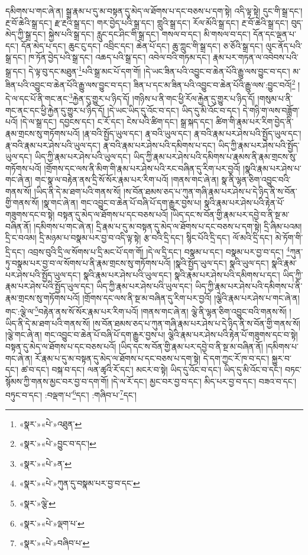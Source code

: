 དམིགས་པ་གང་ཞེ་ན། སྒྲ་རྣམ་པ་དུ་མ་བསྟན་དུ་མེད་ལ་ཐོགས་པ་དང་བཅས་པ་དག་སྟེ། འདི་ལྟ་སྟེ། དུང་གི་སྒྲ་དང་། རྔ་བོ་ཆེའི་སྒྲ་དང་། རྫ་རྔའི་སྒྲ་དང་། གར་བྱེད་པའི་སྒྲ་དང་། གླུའི་སྒྲ་དང་། རོལ་མོའི་སྒྲ་དང་། རྔ་བོ་ཆེའི་སྒྲ་དང་། བུད་མེད་ཀྱི་སྒྲ་དང་། སྐྱེས་པའི་སྒྲ་དང་། རླུང་དང་ཤིང་གི་སྒྲ་དང་། གསལ་བ་དང་། མི་གསལ་བ་དང་། དོན་དང་ལྡན་པ་དང་། དོན་མེད་པ་དང་། ཆུང་ངུ་དང་། འབྲིང་དང་། ཆེན་པོ་དང་། ཆུ་ཀླུང་གི་སྒྲ་དང་། ཅ་ཅོའི་སྒྲ་དང་། ལུང་ནོད་པའི་སྒྲ་དང་། ཁ་ཏོན་བྱེད་པའི་སྒྲ་དང་། འཆད་པའི་སྒྲ་དང་། འབེལ་བའི་གཏམ་དང་། རྣམ་པར་གཏན་ལ་འབེབས་པའི་སྒྲ་དང་། དེ་ལྟ་བུ་དང་མཐུན་\footnote{«སྣར་»«པེ་»འཐུན་}པའི་སྒྲ་མང་པོ་དག་གོ། །དེ་ཡང་ཟིན་པའི་འབྱུང་བ་ཆེན་པོའི་རྒྱུ་ལས་བྱུང་བ་དང་། མ་ཟིན་པའི་འབྱུང་བ་ཆེན་པོའི་རྒྱུ་ལས་བྱུང་བ་དང་། ཟིན་པ་དང་མ་ཟིན་པའི་འབྱུང་བ་ཆེན་པོའི་རྒྱུ་ལས་:བྱུང་བའོ།\footnote{«སྣར་»«པེ་»བྱུང་བ་དང་།} །དེ་ལ་དང་པོ་ནི་གང་ནང་\footnote{«སྣར་»«པེ་»ན་}རྐྱེན་དུ་གྱུར་པ་ཉིད་དོ། །གཉིས་པ་ནི་གང་ཕྱི་རོལ་རྐྱེན་དུ་གྱུར་པ་ཉིད་དོ། །གསུམ་པ་ནི་གང་ནང་དང་ཕྱི་རྐྱེན་དུ་གྱུར་པ་ཉིད་དོ། །དེ་ཡང་ཡིད་དུ་འོང་བ་དང་། ཡིད་དུ་མི་འོང་བ་དང་། དེ་གཉི་ག་ལས་བཟློག་པའོ། །དེ་ལ་སྒྲ་དང་། དབྱངས་དང་། ང་རོ་དང་། ངེས་པའི་ཚིག་དང་། སྒྲ་སྐད་དང་། ཚིག་གི་རྣམ་པར་རིག་བྱེད་ནི་རྣམ་གྲངས་སུ་གཏོགས་པའོ། །རྣ་བའི་སྤྱོད་ཡུལ་དང་། རྣ་བའི་ཡུལ་དང་། རྣ་བའི་རྣམ་པར་ཤེས་པའི་སྤྱོད་ཡུལ་དང་། རྣ་བའི་རྣམ་པར་ཤེས་པའི་ཡུལ་དང་། རྣ་བའི་རྣམ་པར་ཤེས་པའི་དམིགས་པ་དང་། ཡིད་ཀྱི་རྣམ་པར་ཤེས་པའི་སྤྱོད་ཡུལ་དང་། ཡིད་ཀྱི་རྣམ་པར་ཤེས་པའི་ཡུལ་དང་། ཡིད་ཀྱི་རྣམ་པར་ཤེས་པའི་དམིགས་པ་རྣམས་ནི་རྣམ་གྲངས་སུ་གཏོགས་པའོ། །གྲོགས་དང་ལས་ནི་མིག་གི་རྣམ་པར་ཤེས་པའི་རང་བཞིན་དུ་རིག་པར་བྱའོ། །སྣའི་རྣམ་པར་ཤེས་པ་གང་ཞེ་ན། གང་སྣ་ལ་བརྟེན་ནས་དྲི་སོ་སོར་རྣམ་པར་རིག་པའོ། །གནས་གང་ཞེ་ན། སྣ་ནི་ལྷན་ཅིག་འབྱུང་བའི་གནས་སོ། །ཡིད་ནི་དེ་མ་ཐག་པའི་གནས་སོ། །ས་བོན་ཐམས་ཅད་པ་ཀུན་གཞི་རྣམ་པར་ཤེས་པ་དེ་ཉིད་ནི་ས་བོན་གྱི་གནས་སོ། །སྣ་གང་ཞེ་ན། གང་འབྱུང་བ་ཆེན་པོ་བཞི་པོ་དག་རྒྱུར་བྱས་པ། སྣའི་རྣམ་པར་ཤེས་པའི་རྟེན་པོ་གཟུགས་དང་བ་སྟེ། བསྟན་དུ་མེད་ལ་ཐོགས་པ་དང་བཅས་པའོ། །ཡིད་དང་ས་བོན་གྱི་རྣམ་པར་དབྱེ་བ་ནི་སྔ་མ་བཞིན་ནོ། །དམིགས་པ་གང་ཞེ་ན། དྲི་རྣམ་པ་དུ་མ་བསྟན་དུ་མེད་ལ་ཐོགས་པ་དང་བཅས་པ་དག་སྟེ། དྲི་ཞིམ་པའམ། དྲི་ང་བའམ། དྲི་མཉམ་པ་བསྣམ་པར་བྱ་བ་འདི་ལྟ་སྟེ། རྩ་བའི་དྲི་དང་། སྙིང་པོའི་དྲི་དང་། ལོ་མའི་དྲི་དང་། མེ་ཏོག་གི་དྲི་དང་། འབྲས་བུའི་དྲི་ལ་སོགས་པ་དྲི་མང་པོ་དག་གོ། །དེ་ལ་དྲི་དང་། བསྣམ་པ་དང་། བསྣམ་པར་བྱ་བ་དང་། \footnote{«སྣར་»«པེ་»ཀུན་དུ་བསྣམ་པར་བྱ་བ་དང་}ཀུན་ཏུ་བསྣམ་པར་བྱ་བ་ལ་སོགས་པ་ནི་རྣམ་གྲངས་སུ་གཏོགས་པའོ། །སྣའི་སྤྱོད་ཡུལ་དང་། སྣའི་ཡུལ་དང་། སྣའི་རྣམ་པར་ཤེས་པའི་སྤྱོད་ཡུལ་དང་། སྣའི་རྣམ་པར་ཤེས་པའི་ཡུལ་དང་། སྣའི་རྣམ་པར་ཤེས་པའི་དམིགས་པ་དང་། ཡིད་ཀྱི་རྣམ་པར་ཤེས་པའི་སྤྱོད་ཡུལ་དང་། ཡིད་ཀྱི་རྣམ་པར་ཤེས་པའི་ཡུལ་དང་། ཡིད་ཀྱི་རྣམ་པར་ཤེས་པའི་དམིགས་པ་ནི་རྣམ་གྲངས་སུ་གཏོགས་པའོ། །གྲོགས་དང་ལས་ནི་སྔ་མ་བཞིན་དུ་རིག་པར་བྱའོ། །ལྕེའི་རྣམ་པར་ཤེས་པ་གང་ཞེ་ན། གང་:ལྕེ་ལ་\footnote{«སྣར་»ལྕེ་}བརྟེན་ནས་སོ་སོར་རྣམ་པར་རིག་པའོ། །གནས་གང་ཞེ་ན། ལྕེ་ནི་ལྷན་ཅིག་འབྱུང་བའི་གནས་སོ། །ཡིད་ནི་དེ་མ་ཐག་པའི་གནས་སོ། །ས་བོན་ཐམས་ཅད་པ་ཀུན་གཞི་རྣམ་པར་ཤེས་པ་དེ་ཉིད་ནི་ས་བོན་གྱི་གནས་སོ། །ལྕེ་གང་ཞེ་ན། གང་འབྱུང་བ་ཆེན་པོ་བཞི་པོ་དག་རྒྱུར་བྱས་པ། ལྕེའི་རྣམ་པར་ཤེས་པའི་རྟེན་པོ་གཟུགས་དང་བ་སྟེ། བསྟན་དུ་མེད་ལ་ཐོགས་པ་དང་བཅས་པའོ། །ཡིད་དང་ས་བོན་གྱི་རྣམ་པར་དབྱེ་བ་ནི་སྔ་མ་བཞིན་ནོ། །དམིགས་པ་གང་ཞེ་ན། རོ་རྣམ་པ་དུ་མ་བསྟན་དུ་མེད་ལ་ཐོགས་པ་དང་བཅས་པ་དག་སྟེ། དེ་དག་ཀྱང་རོ་ཁ་བ་དང་། སྐྱུར་བ་དང་། ཚ་བ་དང་། བསྐ་བ་དང་། ལན་ཚྭའི་རོ་དང་། མངར་བ་སྟེ། ཡིད་དུ་འོང་བ་དང་། ཡིད་དུ་མི་འོང་བ་དང་། བཏང་སྙོམས་ཀྱི་གནས་མྱང་བར་བྱ་བ་དག་གོ། །དེ་ལ་རོ་དང་། མྱང་བར་བྱ་བ་དང་། མིད་པར་བྱ་བ་དང་། བཟའ་བ་དང་། བཏུང་བ་དང་། :བལྡག་པ་\footnote{«སྣར་»«པེ་»ལྡག་པ་}དང་། :གཞིབ་པ་\footnote{«སྣར་»«པེ་»བཞིབ་པ་}དང་། 